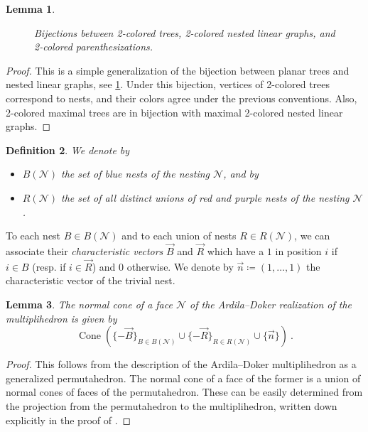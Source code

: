 \documentclass[twoside, 12pt]{amsart}
\newtheorem{definition}{Definition}[section]
\newtheorem{lemma}[definition]{Lemma}
\theoremstyle{remark}
\newcommand{\blue}[1]{\textcolor{MidnightBlue}{\textbf{(}} #1 \textcolor{MidnightBlue}{\textbf{)}}}
\newcommand{\red}[1]{\textcolor{BrickRed}{\textbf{(}} #1 \textcolor{BrickRed}{\textbf{)}}}
\newcommand{\purple}[1]{\textcolor{Purple}{\textbf{(}} #1 \textcolor{Purple}{\textbf{)}}}
\DeclareMathOperator{\cone}{Cone} %
\begin{document}
\begin{lemma}
\begin{figure}[h!]
{}
\caption{Bijections between 2-colored trees, 2-colored nested linear graphs, and 2-colored parenthesizations.}
\label{fig:bijections}
\end{figure}
\end{lemma}

\begin{proof}
This is a simple generalization of the bijection between planar trees and nested linear graphs, see \cref{fig:bijections}. 
Under this bijection, vertices of 2-colored trees correspond to nests, and their colors agree under the previous conventions. 
Also, 2-colored maximal trees are in bijection with maximal 2-colored nested linear graphs. 
\end{proof}

\begin{definition}
We denote by 
\begin{itemize}
  \item $B(\mathcal{N})$ the set of blue nests of the nesting $\mathcal{N}$, and by
  \item $R(\mathcal{N})$ the set of all distinct \emph{unions} of red and purple nests of the nesting $\mathcal{N}$.
\end{itemize}
\end{definition}

To each nest $B \in B(\mathcal{N})$ and to each union of nests $R \in R(\mathcal{N})$, we can associate their \emph{characteristic vectors} $\vec B$ and $\vec R$ which have a $1$ in position $i$ if $i \in B$ (resp. if $i \in \vec R$) and $0$ otherwise. 
We denote by $\vec n \coloneqq (1,\ldots,1)$ the characteristic vector of the trivial nest. 

\begin{lemma} 
\label{lemma:normalcones}
The normal cone of a face $\mathcal{N}$ of the Ardila--Doker realization of the multiplihedron is given by \[\cone\left(\{-\vec B\}_{B \in B(\mathcal{N})} \cup \{-\vec R\}_{R \in R(\mathcal{N})} \cup \{\vec n\} \right) \ . \]
\end{lemma}

\begin{proof} 
This follows from the description of the Ardila--Doker multiplihedron as a generalized permutahedron. 
The normal cone of a face of the former is a union of normal cones of faces of the permutahedron. 
These can be easily determined from the projection from the permutahedron to the multiplihedron, written down explicitly in the proof of \cite[Theorem 3.3.6]{Doker11}.
\end{proof}
\end{document}

